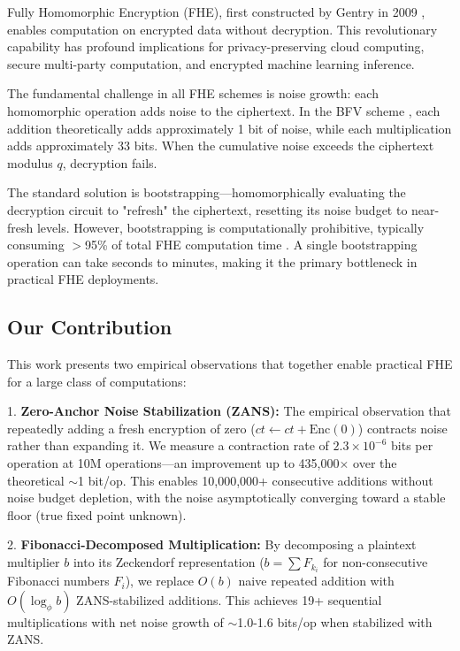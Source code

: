 \documentclass[11pt]{article}
\begin{document}
Fully Homomorphic Encryption (FHE), first constructed by Gentry in 2009 \cite{gentry2009fully}, enables computation on encrypted data without decryption. This revolutionary capability has profound implications for privacy-preserving cloud computing, secure multi-party computation, and encrypted machine learning inference.

The fundamental challenge in all FHE schemes is noise growth: each homomorphic operation adds noise to the ciphertext. In the BFV scheme \cite{brakerski2011efficient}, each addition theoretically adds approximately 1 bit of noise, while each multiplication adds approximately 33 bits. When the cumulative noise exceeds the ciphertext modulus $q$, decryption fails.

The standard solution is bootstrapping—homomorphically evaluating the decryption circuit to "refresh" the ciphertext, resetting its noise budget to near-fresh levels. However, bootstrapping is computationally prohibitive, typically consuming $>$95\% of total FHE computation time \cite{microsoft2023seal, openfhe2024}. A single bootstrapping operation can take seconds to minutes, making it the primary bottleneck in practical FHE deployments.

\subsection{Our Contribution}

This work presents two empirical observations that together enable practical FHE for a large class of computations:

1. \textbf{Zero-Anchor Noise Stabilization (ZANS):} The empirical observation that repeatedly adding a fresh encryption of zero ($ct \leftarrow ct + \text{Enc}(0)$) contracts noise rather than expanding it. We measure a contraction rate of $2.3 \times 10^{-6}$ bits per operation at 10M operations—an improvement up to 435,000$\times$ over the theoretical $\sim$1 bit/op. This enables 10,000,000+ consecutive additions without noise budget depletion, with the noise asymptotically converging toward a stable floor (true fixed point unknown).

2. \textbf{Fibonacci-Decomposed Multiplication:} By decomposing a plaintext multiplier $b$ into its Zeckendorf representation ($b = \sum F_{k_i}$ for non-consecutive Fibonacci numbers $F_i$), we replace $O(b)$ naive repeated addition with $O(\log_\phi b)$ ZANS-stabilized additions. This achieves 19+ sequential multiplications with net noise growth of $\sim$1.0-1.6 bits/op when stabilized with ZANS.
\end{document}
